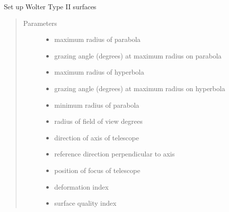 \documentclass[letterpaper,10pt,english]{sphinxmanual}
\begin{document}
\begin{fulllineitems}
\label{\detokenize{xsrt_functions:xsrt.wolter2}}
Set up Wolter Type II surfaces
\begin{quote}\begin{description}
\item[{Parameters}] \leavevmode\begin{itemize}
\item {} 
 \textendash{} maximum radius of parabola

\item {} 
 \textendash{} grazing angle (degrees) at maximum radius on parabola

\item {} 
 \textendash{} maximum radius of hyperbola

\item {} 
 \textendash{} grazing angle (degrees) at maximum radius on hyperbola

\item {} 
 \textendash{} minimum radius of parabola

\item {} 
 \textendash{} radius of field of view degrees

\item {} 
 \textendash{} direction of axis of telescope

\item {} 
 \textendash{} reference direction perpendicular to axis

\item {} 
 \textendash{} position of focus of telescope

\item {} 
 \textendash{} deformation index

\item {} 
 \textendash{} surface quality index


\end{itemize}
\end{description}
\end{quote}
\end{fulllineitems}
\end{document}
